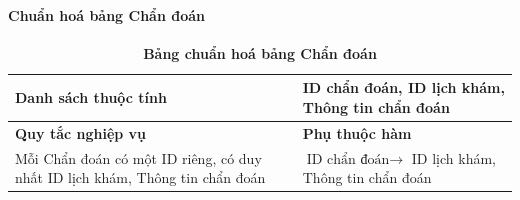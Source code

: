 \paragraph{Chuẩn hoá bảng Chẩn đoán}
\mbox{}
\begin{table}[H]
	\caption{\bfseries \fontsize{12pt}{0pt}\selectfont Bảng chuẩn hoá bảng Chẩn đoán}
	\centering
	\begin{tabularx}{0.9\textwidth}{|X|X|}
		\hline
		\textbf{Danh sách thuộc tính} & ID chẩn đoán, ID lịch khám, Thông tin chẩn đoán                                             \\
		\hline
		\textbf{Quy tắc nghiệp vụ}    & \textbf{Phụ thuộc hàm}                                                                      \\
		\hline
		Mỗi Chẩn đoán có một ID riêng, có duy nhất ID lịch khám, Thông tin chẩn đoán
		                              & \parbox[t]{\linewidth}{$\text{ID chẩn đoán} \rightarrow$ ID lịch khám, Thông tin chẩn đoán} \\
		\hline
		                                               \\
		                                                          \\
		\hline
	\end{tabularx}
\end{table}

